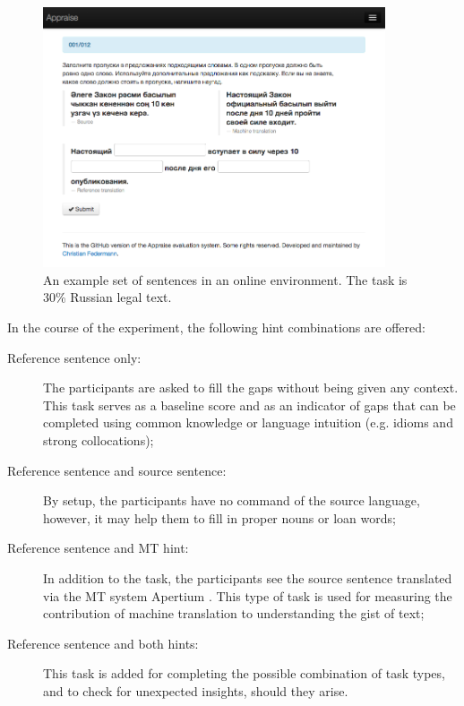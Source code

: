 \documentclass[11pt]{article}
\newcommand{\comment}[1]{\marginpar{\scriptsize\sf \textcolor{blue}{#1}}}
\begin{document}
\begin{figure}
  \centering
\includegraphics[width=0.9\textwidth,resolution=144]{appraise-scr}
 \caption{An example set of sentences in an online environment. The task is 30\% Russian legal text.}
\label{figure:screenshot}
\end{figure}

\comment{EA: I don't really have a good explanation why we used source+mt tasks, except for being exhaustive. could you suggest anything?}
In the course of the experiment, the following hint combinations are offered:
\begin{description}
\item[Reference sentence only:] The participants are asked to fill the gaps without being given
any context. This task serves as a baseline score and as an indicator of gaps
that can be completed using common knowledge or language intuition (e.g.
idioms and strong collocations);
\item[Reference sentence and source sentence:] By setup, the
participants have no command of the source language, however, it may help them to fill
in proper nouns or loan words;
\item[Reference sentence and MT hint:] In addition to the task, the
participants see the source sentence translated via the MT system Apertium \citep{forcada11}. This type of task is
used for measuring the contribution of machine translation to understanding the
gist of text;
\item[Reference sentence and both hints:] This task is
added for completing the possible combination of task types, and to check
for unexpected insights, should they arise.
\end{description}
\end{document}
